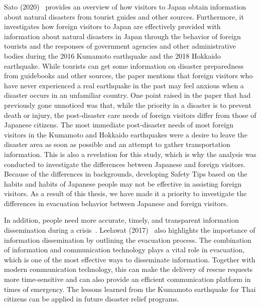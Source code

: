 Sato (2020)~\cite{ref8} provides an overview of how visitors to Japan obtain information about natural disasters from tourist guides and other sources. Furthermore, it investigates how foreign visitors to Japan are effectively provided with information about natural disasters in Japan through the behavior of foreign tourists and the responses of government agencies and other administrative bodies during the 2016 Kumamoto earthquake and the 2018 Hokkaido earthquake. While tourists can get some information on disaster preparedness from guidebooks and other sources, the paper mentions that foreign visitors who have never experienced a real earthquake in the past may feel anxious when a disaster occurs in an unfamiliar country. One point raised in the paper that had previously gone unnoticed was that, while the priority in a disaster is to prevent death or injury, the post-disaster care needs of foreign visitors differ from those of Japanese citizens. The most immediate post-disaster needs of most foreign visitors in the Kumamoto and Hokkaido earthquakes were a desire to leave the disaster area as soon as possible and an attempt to gather transportation information. This is also a revelation for this study, which is why the analysis was conducted to investigate the differences between Japanese and foreign visitors. Because of the differences in backgrounds, developing Safety Tips based on the habits and habits of Japanese people may not be effective in assisting foreign visitors. As a result of this thesis, we have made it a priority to investigate the differences in evacuation behavior between Japanese and foreign visitors.

In addition, people need more accurate, timely, and transparent information dissemination during a crisis~\cite{ref49}. Leelawat (2017)~\cite{ref51} also highlights the importance of information dissemination by outlining the evacuation process. The combination of information and communication technology plays a vital role in evacuation, which is one of the most effective ways to disseminate information. Together with modern communication technology, this can make the delivery of rescue requests more time-sensitive and can also provide an efficient communication platform in times of emergency. The lessons learned from the Kumamoto earthquake for Thai citizens can be applied in future disaster relief programs. 

